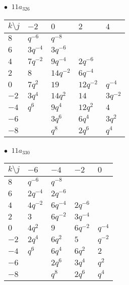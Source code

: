 \begin{minipage}{\linewidth}
$\bullet\ $ $11a_{326}$ \vspace{0.5em} \\
\begin{tabular}{l|llll}
$k \setminus j$ & $-2$ & $0$ & $2$ & $4$ \\
\hline
$8$ & $q^{-6}$ & $q^{-8}$ &  &  \\
$6$ & $3q^{-4}$ & $3q^{-6}$ &  &  \\
$4$ & $7q^{-2}$ & $9q^{-4}$ & $2q^{-6}$ &  \\
$2$ & $8$ & $14q^{-2}$ & $6q^{-4}$ &  \\
$0$ & $7q^{2}$ & $19$ & $12q^{-2}$ & $q^{-4}$ \\
$-2$ & $3q^{4}$ & $14q^{2}$ & $14$ & $3q^{-2}$ \\
$-4$ & $q^{6}$ & $9q^{4}$ & $12q^{2}$ & $4$ \\
$-6$ &  & $3q^{6}$ & $6q^{4}$ & $3q^{2}$ \\
$-8$ &  & $q^{8}$ & $2q^{6}$ & $q^{4}$ \\
\end{tabular}
\vspace{2em}
\end{minipage}
%
\begin{minipage}{\linewidth}
$\bullet\ $ $11a_{330}$ \vspace{0.5em} \\
\begin{tabular}{l|llll}
$k \setminus j$ & $-6$ & $-4$ & $-2$ & $0$ \\
\hline
$8$ & $q^{-6}$ & $q^{-8}$ &  &  \\
$6$ & $2q^{-4}$ & $2q^{-6}$ &  &  \\
$4$ & $4q^{-2}$ & $6q^{-4}$ & $2q^{-6}$ &  \\
$2$ & $3$ & $6q^{-2}$ & $3q^{-4}$ &  \\
$0$ & $4q^{2}$ & $9$ & $6q^{-2}$ & $q^{-4}$ \\
$-2$ & $2q^{4}$ & $6q^{2}$ & $5$ & $q^{-2}$ \\
$-4$ & $q^{6}$ & $6q^{4}$ & $6q^{2}$ & $2$ \\
$-6$ &  & $2q^{6}$ & $3q^{4}$ & $q^{2}$ \\
$-8$ &  & $q^{8}$ & $2q^{6}$ & $q^{4}$ \\
\end{tabular}
\vspace{2em}
\end{minipage}
%
